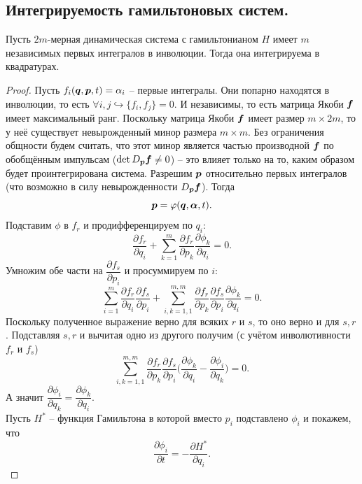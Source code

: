 \subsection{Интегрируемость гамильтоновых систем.}
\begin{theorem}
    Пусть $2m$-мерная динамическая система с гамильтонианом $H$ имеет $m$ независимых первых интегралов в инволюции.
    Тогда она интегрируема в квадратурах.
\end{theorem}
\begin{proof}
    Пусть $f_i(\boldsymbol{q}, \boldsymbol{p}, t) = \alpha_i$ -- первые интегралы.
    Они попарно находятся в инволюции, то есть $\forall i, j \hookrightarrow\{f_i, f_j\} = 0$.
    И независимы, то есть матрица Якоби $\boldsymbol{f}$ имеет максимальный ранг.
    Поскольку матрица Якоби $\boldsymbol{f}$ имеет размер $m \times 2m$, то у неё существует невырожденный минор размера $m \times m$.
    Без ограничения общности будем считать, что этот минор является частью производной $\boldsymbol{f}$ по обобщённым импульсам ($\det D_{\boldsymbol{p}}\boldsymbol{f} \neq 0$) -- это влияет только на то, каким образом будет проинтегрирована система.
    Разрешим $\boldsymbol{p}$ относительно первых интегралов (что возможно в силу невырожденности $D_{\boldsymbol{p}}\boldsymbol{f}$).
    Тогда
    \[
        \boldsymbol{p} = \varphi(\boldsymbol{q}, \boldsymbol{\alpha}, t).
    \]
    Подставим $\phi$ в $f_r$ и продифференцируем по $q_i$:
    \[
        \dfrac{\partial f_r}{\partial q_i} + \sum\limits_{k = 1}^m \dfrac{\partial f_r}{\partial p_k} \dfrac{\partial \phi_k}{\partial q_i} = 0.
    \]
    Умножим обе части на $\dfrac{\partial f_s}{\partial p_i}$ и просуммируем по $i$:
    \[
        \sum\limits_{i = 1}^m \dfrac{\partial f_r}{\partial q_i} \dfrac{\partial f_s}{\partial p_i} + \sum\limits_{i, k = 1, 1}^{m, m} \dfrac{\partial f_r}{\partial p_k} \dfrac{\partial f_s}{\partial p_i} \dfrac{\partial \phi_k}{\partial q_i} = 0.
    \]
    Поскольку полученное выражение верно для всяких $r$ и $s$, то оно верно и для $s, r$.
    Подставляя $s, r$ и вычитая одно из другого получим (с учётом инволютивности $f_r$ и $f_s$)
    \[
        \sum\limits_{i, k = 1, 1}^{m, m} \dfrac{\partial f_r}{\partial p_k}\dfrac{\partial f_s}{\partial p_i} \biggr(\dfrac{\partial \phi_k}{\partial q_i} - \dfrac{\partial \phi_i}{\partial q_k}\biggr) = 0.
    \]
    А значит $\dfrac{\partial \phi_i}{\partial q_k} = \dfrac{\partial \phi_k}{\partial q_i}$. \\
    Пусть $H^*$ -- функция Гамильтона в которой вместо $p_i$ подставлено $\phi_i$ и покажем, что
    \[
        \dfrac{\partial \phi_i}{\partial t} = - \dfrac{\partial H^*}{\partial q_i}.
\]
\end{proof}
